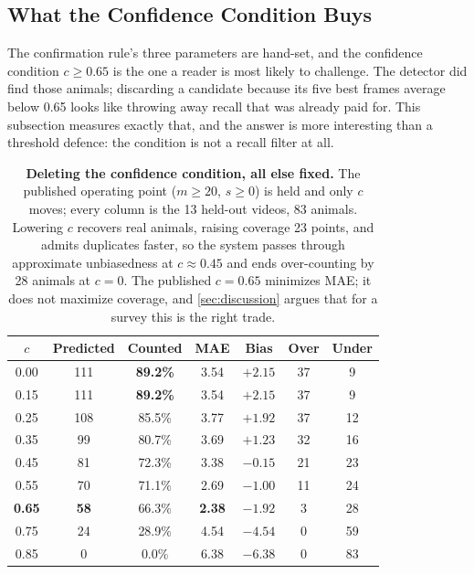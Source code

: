 \subsection{What the Confidence Condition Buys}
\label{sec:sensitivity}

The confirmation rule's three parameters are hand-set, and the confidence condition
$c\ge0.65$ is the one a reader is most likely to challenge. The detector did find those
animals; discarding a candidate because its five best frames average below 0.65 looks like
throwing away recall that was already paid for. This subsection measures exactly that, and
the answer is more interesting than a threshold defence: the condition is not a recall
filter at all.

\begin{table}[H]
\caption{\textbf{Deleting the confidence condition, all else fixed.} The published operating
point ($m\ge20$, $s\ge0$) is held and only $c$ moves; every column is the 13 held-out videos,
83 animals. Lowering $c$ recovers real animals, raising coverage 23 points, and admits duplicates faster, so the system passes through approximate unbiasedness at $c\approx0.45$
and ends over-counting by 28 animals at $c=0$. The published $c=0.65$ minimizes MAE; it does
not maximize coverage, and \cref{sec:discussion} argues that for a survey this is the right
trade.\label{tab:confsens}}
\centering
\begin{tabularx}{\textwidth}{CCCCCCC}
\toprule
\textbf{$c$} & \textbf{Predicted} & \textbf{Counted} & \textbf{MAE} & \textbf{Bias} & \textbf{Over} & \textbf{Under} \\
 & 111 & \textbf{89.2\%} & 3.54 & $+2.15$ & 37 & 9 \\
0.15 & 111 & \textbf{89.2\%} & 3.54 & $+2.15$ & 37 & 9 \\
0.25 & 108 & 85.5\% & 3.77 & $+1.92$ & 37 & 12 \\
0.35 &  99 & 80.7\% & 3.69 & $+1.23$ & 32 & 16 \\
0.45 &  81 & 72.3\% & 3.38 & $\mathbf{-0.15}$ & 21 & 23 \\
0.55 &  70 & 71.1\% & 2.69 & $-1.00$ & 11 & 24 \\
\textbf{0.65} & \textbf{58} & 66.3\% & \textbf{2.38} & $-1.92$ & 3 & 28 \\
0.75 &  24 & 28.9\% & 4.54 & $-4.54$ & 0 & 59 \\
0.85 &   0 &  0.0\% & 6.38 & $-6.38$ & 0 & 83 \\
\bottomrule
\end{tabularx}
\end{table}


